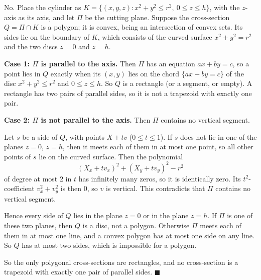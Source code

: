 No. Place the cylinder as $K=\{(x,y,z):x^2+y^2\le r^2,\ 0\le z\le h\}$, with the $z$-axis as its axis, and let $\Pi$ be the cutting plane. Suppose the cross-section $Q=\Pi\cap K$ is a polygon; it is convex, being an intersection of convex sets. Its sides lie on the boundary of $K$, which consists of the curved surface $x^2+y^2=r^2$ and the two discs $z=0$ and $z=h$.

\textbf{Case 1: $\Pi$ is parallel to the axis.} Then $\Pi$ has an equation $ax+by=c$, so a point lies in $Q$ exactly when its $(x,y)$ lies on the chord $\{ax+by=c\}$ of the disc $x^2+y^2\le r^2$ and $0\le z\le h$. So $Q$ is a rectangle (or a segment, or empty). A rectangle has two pairs of parallel sides, so it is not a trapezoid with exactly one pair.

\textbf{Case 2: $\Pi$ is not parallel to the axis.} Then $\Pi$ contains no vertical segment.

Let $s$ be a side of $Q$, with points $X+tv$ ($0\le t\le1$). If $s$ does not lie in one of the planes $z=0$, $z=h$, then it meets each of them in at most one point, so all other points of $s$ lie on the curved surface. Then the polynomial
\[\left(X_x+tv_x\right)^2+\left(X_y+tv_y\right)^2-r^2\]
of degree at most $2$ in $t$ has infinitely many zeros, so it is identically zero. Its $t^2$-coefficient $v_x^2+v_y^2$ is then $0$, so $v$ is vertical. This contradicts that $\Pi$ contains no vertical segment.

Hence every side of $Q$ lies in the plane $z=0$ or in the plane $z=h$. If $\Pi$ is one of these two planes, then $Q$ is a disc, not a polygon. Otherwise $\Pi$ meets each of them in at most one line, and a convex polygon has at most one side on any line. So $Q$ has at most two sides, which is impossible for a polygon.

So the only polygonal cross-sections are rectangles, and no cross-section is a trapezoid with exactly one pair of parallel sides. $\blacksquare$

